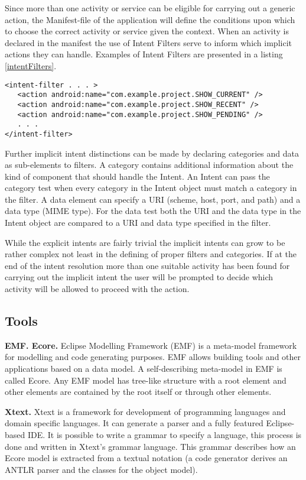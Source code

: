 Since more than one activity or service can be eligible for carrying out a generic action, the Manifest-file of the application will define the conditions upon which to choose the correct activity or service given the context. When an activity is declared in the manifest the use of Intent Filters serve to inform which implicit actions they can handle. Examples of Intent Filters are presented in a listing \ref{intentFilters}.

{\footnotesize\begin{lstlisting}[label=intentFilters,caption=Intent Filters]
<intent-filter . . . >
   <action android:name="com.example.project.SHOW_CURRENT" />
   <action android:name="com.example.project.SHOW_RECENT" />
   <action android:name="com.example.project.SHOW_PENDING" />
   . . .
</intent-filter>
\end{lstlisting}}

Further implicit intent distinctions can be made by declaring categories and data as sub-elements to filters. A category contains additional information about the kind of component that should handle the Intent. An Intent can pass the category test when every category in the Intent object must match a category in the filter. A data element can specify a URI (scheme, host, port, and path) and a data type (MIME type). For the data test both the URI and the data type in the Intent object are compared to a URI and data type specified in the filter. 

While the explicit intents are fairly trivial the implicit intents can grow to be rather complex not least in the defining of proper filters and categories. If at the end of the intent resolution more than one suitable activity has been found for carrying out the implicit intent the user will be prompted to decide which activity will be allowed to proceed with the action. 


\subsection{Tools}
\label{tools}
\textbf{EMF. Ecore.} Eclipse Modelling Framework (EMF) \cite{emf} is a meta-model framework for modelling and code generating purposes. EMF allows building tools and other applications based on a data model. A self-describing meta-model in EMF is called Ecore. Any EMF model has tree-like structure with a root element and other elements are contained by the root itself or through other elements. 

\textbf{Xtext.} Xtext \cite{xtext} is a framework for development of programming languages and domain specific languages. It can generate a parser and a fully featured Eclipse-based IDE. It is possible to write a grammar to specify a language, this process is done and written in Xtext's grammar language. This grammar describes how an Ecore model is extracted from a textual notation (a code generator derives an ANTLR parser and the classes for the object model).

